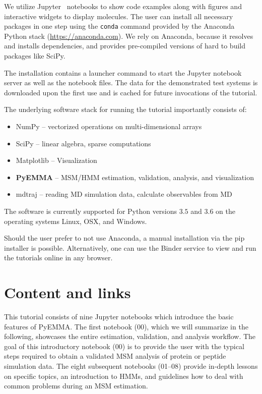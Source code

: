 \documentclass[9pt,tutorial]{livecoms}
\begin{document}
We utilize Jupyter~\cite{jupyter} notebooks to show code examples along with figures and interactive widgets to display molecules.
The user can install all necessary packages in one step using the \texttt{conda} command provided by the Anaconda Python stack (\url{https://anaconda.com}).
We rely on Anaconda, because it resolves and installs dependencies, and provides pre-compiled versions of hard to build packages like SciPy.

The installation contains a launcher command to start the Jupyter notebook server as well as the notebook files.
The data for the demonstrated test systems is downloaded upon the first use and is cached for future invocations of the tutorial.

The underlying software stack for running the tutorial importantly consists of:
\begin{itemize}
\item NumPy -- vectorized operations on multi-dimensional arrays~\cite{numpy}
\item SciPy -- linear algebra, sparse computations~\cite{scipy}
\item Matplotlib -- Visualization~\cite{matplotlib}
\item \textbf{PyEMMA} -- MSM/HMM estimation, validation, analysis, and visualization~\cite{pyemma}
\item mdtraj -- reading MD simulation data, calculate observables from MD~\cite{mdtraj}
\end{itemize}

The software is currently supported for Python versions $3.5$ and $3.6$ on the operating systems Linux, OSX, and Windows.

Should the user prefer to not use Anaconda, a manual installation via the pip installer is possible.
Alternatively, one can use the Binder service to view and run the tutorials online in any browser.

\section{Content and links}

This tutorial consists of nine Jupyter notebooks which introduce the basic features of PyEMMA.
The first notebook (00), which we will summarize in the following, showcases the entire estimation, validation, and analysis workflow.
The goal of this introductory notebook (00) is to provide the user with the typical steps required to obtain a validated MSM analysis of protein or peptide simulation data.
The eight subsequent notebooks (01--08) provide in-depth lessons on specific topics, an introduction to HMMs, and guidelines how to deal with common problems during an MSM estimation.
\end{document}
